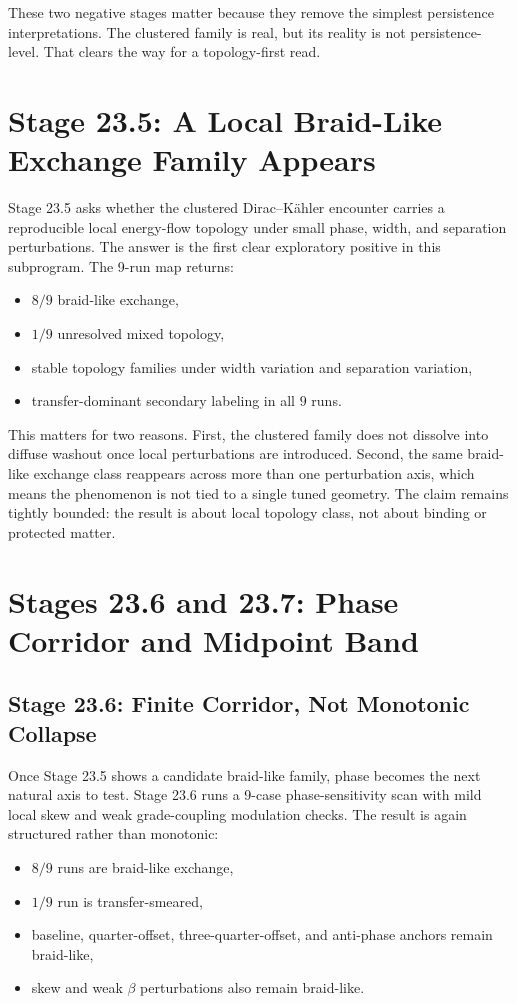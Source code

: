 \documentclass[11pt]{article}
\begin{document}
These two negative stages matter because they remove the simplest persistence interpretations. The clustered family is real, but its reality is not persistence-level. That clears the way for a topology-first read.

\section{Stage 23.5: A Local Braid-Like Exchange Family Appears}

Stage 23.5 asks whether the clustered Dirac--K\"ahler encounter carries a reproducible local energy-flow topology under small phase, width, and separation perturbations. The answer is the first clear exploratory positive in this subprogram. The 9-run map returns:
\begin{itemize}
\item $8/9$ braid-like exchange,
\item $1/9$ unresolved mixed topology,
\item stable topology families under width variation and separation variation,
\item transfer-dominant secondary labeling in all $9$ runs.
\end{itemize}

This matters for two reasons. First, the clustered family does not dissolve into diffuse washout once local perturbations are introduced. Second, the same braid-like exchange class reappears across more than one perturbation axis, which means the phenomenon is not tied to a single tuned geometry. The claim remains tightly bounded: the result is about local topology class, not about binding or protected matter.

\section{Stages 23.6 and 23.7: Phase Corridor and Midpoint Band}

\subsection{Stage 23.6: Finite Corridor, Not Monotonic Collapse}

Once Stage 23.5 shows a candidate braid-like family, phase becomes the next natural axis to test. Stage 23.6 runs a 9-case phase-sensitivity scan with mild local skew and weak grade-coupling modulation checks. The result is again structured rather than monotonic:
\begin{itemize}
\item $8/9$ runs are braid-like exchange,
\item $1/9$ run is transfer-smeared,
\item baseline, quarter-offset, three-quarter-offset, and anti-phase anchors remain braid-like,
\item skew and weak $\beta$ perturbations also remain braid-like.
\end{itemize}
\end{document}
